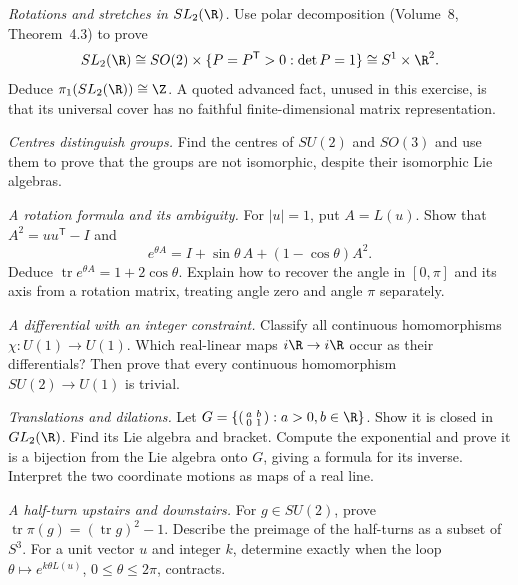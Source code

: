 \begin{exercise}[$\star\star$]\label{ex:sl2pi1}
\emph{Rotations and stretches in $SL_2(\R)$.}
Use polar decomposition (Volume~8, Theorem~4.3) to prove
\[
 SL_2(\R)\cong SO(2)\times\{P=P^{\mathsf T}>0:\det P=1\}
 \cong S^1\times\R^2.
\]
Deduce $\pi_1(SL_2(\R))\cong\Z$.
A quoted advanced fact, unused in this exercise, is that its universal
cover has no faithful finite-dimensional matrix representation.
\end{exercise}
\begin{exercise}[$\star$]\label{ex:centersu2}
\emph{Centres distinguish groups.}
Find the centres of $SU(2)$ and $SO(3)$ and use them to prove that the
groups are not isomorphic, despite their isomorphic Lie algebras.
\end{exercise}

\begin{exercise}[$\star\star$]\label{ex:v9-rodrigues}
\emph{A rotation formula and its ambiguity.}
For $|u|=1$, put $A=L(u)$. Show that $A^2=uu^{\mathsf T}-I$ and
\[
 e^{\theta A}=I+\sin\theta\,A+(1-\cos\theta)A^2.
\]
Deduce $\operatorname{tr}e^{\theta A}=1+2\cos\theta$.
Explain how to recover the angle in $[0,\pi]$ and its axis from a rotation
matrix, treating angle zero and angle $\pi$ separately.
\end{exercise}
\begin{exercise}[$\star\star$]\label{ex:v9-circle-homomorphisms}
\emph{A differential with an integer constraint.}
Classify all continuous homomorphisms $\chi:U(1)\to U(1)$.
Which real-linear maps $i\R\to i\R$ occur as their differentials?
Then prove that every continuous homomorphism $SU(2)\to U(1)$ is trivial.
\end{exercise}
\begin{exercise}[$\star\star$]\label{ex:v9-affine-exponential}
\emph{Translations and dilations.}
Let $G=\{\left(\begin{smallmatrix}a&b\\0&1\end{smallmatrix}\right):a>0,b\in\R\}$.
Show it is closed in $GL_2(\R)$. Find its Lie algebra and bracket.
Compute the exponential and prove it is a bijection from the Lie algebra
onto $G$, giving a formula for its inverse. Interpret the two coordinate
motions as maps of a real line.
\end{exercise}
\begin{exercise}[$\star\star$]\label{ex:v9-spin-traces}
\emph{A half-turn upstairs and downstairs.}
For $g\in SU(2)$, prove
$\operatorname{tr}\pi(g)=(\operatorname{tr}g)^2-1$.
Describe the preimage of the half-turns as a subset of $S^3$.
For a unit vector $u$ and integer $k$, determine exactly when the loop
$\theta\mapsto e^{k\theta L(u)}$, $0\le\theta\le2\pi$, contracts.
\end{exercise}


